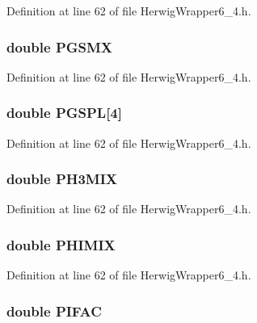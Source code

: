 Definition at line 62 of file Herwig\-Wrapper6\_\-4.h.
\subsubsection{\setlength{\rightskip}{0pt plus 5cm}double {\bf PGSMX}}\label{HerwigWrapper6__4_8h_731a44cab84fcb7cd1774ee930cb8891}




Definition at line 62 of file Herwig\-Wrapper6\_\-4.h.
\subsubsection{\setlength{\rightskip}{0pt plus 5cm}double {\bf PGSPL}[4]}\label{HerwigWrapper6__4_8h_d322c58675fd27623b2322dc870f08e7}




Definition at line 62 of file Herwig\-Wrapper6\_\-4.h.
\subsubsection{\setlength{\rightskip}{0pt plus 5cm}double {\bf PH3MIX}}\label{HerwigWrapper6__4_8h_70f12d4f7002a5e39e263811c661a1ec}




Definition at line 62 of file Herwig\-Wrapper6\_\-4.h.
\subsubsection{\setlength{\rightskip}{0pt plus 5cm}double {\bf PHIMIX}}\label{HerwigWrapper6__4_8h_0a92709acc05709cce1994aeae4a84ba}




Definition at line 62 of file Herwig\-Wrapper6\_\-4.h.
\subsubsection{\setlength{\rightskip}{0pt plus 5cm}double {\bf PIFAC}}\label{HerwigWrapper6__4_8h_355ddddcc69a95632179f93222f56198}




